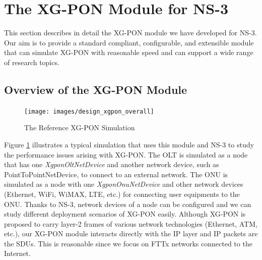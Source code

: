 \section{The XG-PON Module for NS-3} \label{section_design}



This section describes in detail the XG-PON module we have
developed for NS-3. Our aim is to provide a standard compliant,
configurable, and extensible module that can simulate XG-PON with
reasonable speed and can support a wide range of research topics.




\subsection{Overview of the XG-PON Module} \label{subsection_xgponoverview}



\begin{figure}[!htbp]
\begin{center}
\texttt{[image: images/design\_xgpon\_overall]}
\end{center}
\vspace{-0.1in}
\caption{The Reference XG-PON Simulation}
\label{fig_xgpon_reference_simulation}
\end{figure}


Figure \ref{fig_xgpon_reference_simulation} illustrates a typical
simulation that uses this module and NS-3 to study the performance
issues arising with XG-PON. The OLT is simulated as a node that
has one \emph{XgponOltNetDevice} and another network device, such
as PointToPointNetDevice, to connect to an external network. The
ONU is simulated as a node with one \emph{XgponOnuNetDevice} and
other network devices (Ethernet, WiFi, WiMAX, LTE, etc.) for
connecting user equipments to the ONU. Thanks to NS-3, network
devices of a node can be configured and we can study different
deployment scenarios of XG-PON easily. Although XG-PON is proposed
to carry layer-2 frames of various network technologies (Ethernet,
ATM, etc.), our XG-PON module interacts directly with the IP layer
and IP packets are the SDUs. This is reasonable since we focus on
FTTx networks connected to the Internet.






